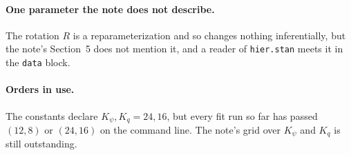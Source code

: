 \documentclass[11pt]{article}
\newcommand{\file}[1]{\texttt{#1}}
\newcommand{\code}[1]{\texttt{#1}}
\begin{document}
\paragraph{One parameter the note does not describe.} The rotation $R$ is a
reparameterization and so changes nothing inferentially, but the note's
Section~5 does not mention it, and a reader of \file{hier.stan} meets it in the
\code{data} block.

\paragraph{Orders in use.} The constants declare $K_{\psi}, K_{q} = 24, 16$, but every fit
run so far has passed $(12, 8)$ or $(24, 16)$ on the command line. The note's grid over
$K_{\psi}$ and $K_{q}$ is still outstanding.
\end{document}
